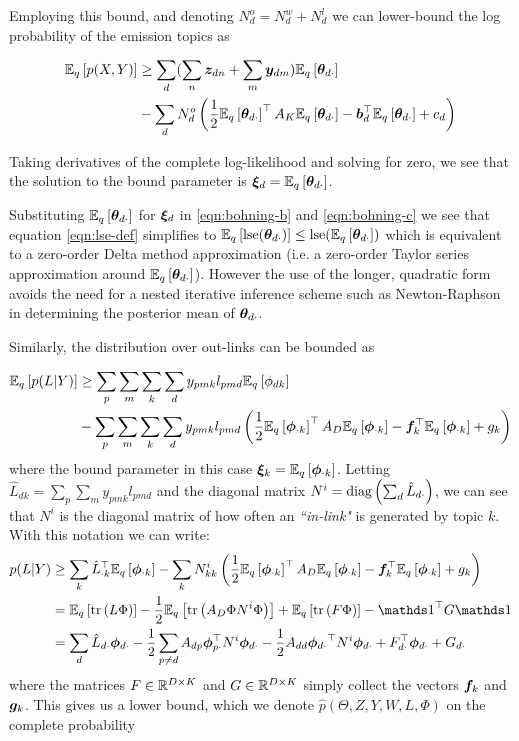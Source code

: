 Employing this bound, and denoting $N^o_d = N^w_d + N^l_d$ we can lower-bound the log probability of the emission topics as

\begin{equation}
\begin{aligned}
\ex{p(X,Y)}{q} & \geq \sum_d  (\sum_n \vv{z}_{dn} + \sum_m \vv{y}_{dm}) \ex{\thdo}{q} \\
   & - \sum_d N^o_d \left(\half \ex{\thdo}{q}\T A_K \ex{\thdo}{q} - \vv{b}_d\T\ex{\thdo}{q} + c_d\right)
\end{aligned}
\end{equation}

Taking derivatives of the complete log-likelihood and solving for zero, we see that the solution to the bound parameter is $\Ed = \ex{\thdo}{q}$. 

Substituting $\ex{\thdo}{q}$ for $\Ed$ in \eqref{eqn:bohning-b} and \eqref{eqn:bohning-c} we see that equation \eqref{eqn:lse-def} simplifies to $\ex{\lse(\thdo)}{q} \leq \lse(\ex{\thdo}{q})$ which is equivalent to a zero-order Delta method approximation (i.e. a zero-order Taylor series approximation around $\ex{\thdo}{q}$). However the use of the longer, quadratic form avoids the need for a nested iterative inference scheme such as Newton-Raphson in determining the posterior mean of $\thdo$.

Similarly, the distribution over out-links can be bounded as

\begin{align}
\ex{p(L|Y)}{q} & \geq \sum_p \sum_m \sum_k \sum_d y_{pmk} l_{pmd} \ex{\phi_{dk}}{q} \\
 & - \sum_p \sum_m \sum_k \sum_d y_{pmk} l_{pmd} \left(\half \ex{\phok}{q}\T A_D \ex{\phok}{q} - \vv{f}_k\T \ex{\phok}{q} + g_k\right)
\end{align}
where the bound parameter in this case $\vv{\xi}_k = \ex{\phok}{q}$. Letting $\hat{L}_{dk} = \sum_p \sum_m y_{pmk} l_{pmd}$ and the diagonal matrix $N^i = \diag{\sum_d \hat{L}_{d\cdot}}$, we can see that $N^i$ is the diagonal matrix of how often an \emph{``in-link"} is generated by topic $k$. With this notation we can write:
\begin{align}
p(L|Y) & \geq \sum_k \hat{L}_{\cdot k}\T \ex{\phok}{q} - \sum_k N^i_{kk} \left(\half \ex{\phok}{q}\T A_D \ex{\phok}{q} - \vv{f}_k\T \ex{\phok}{q} + g_k\right) \\
& = \ex{\Tr{L \Phi}}{q} - \half \ex{\Tr{A_D \Phi N^i \Phi}}{q} + \ex{\Tr{F \Phi}}{q} - \one\T G \one \\
& = \sum_d \hat{L}_{d\cdot} \phdo - \half \sum_{p \neq d} A_{dp} \vv{\phi}_{p\cdot}\T N^i \phdo -\half A_{dd} \phdo\T N^i \phdo + F_{d\cdot}\T\phdo + G_{d\cdot}
\end{align}
where the matrices $F \in \MReal{D}{K}$ and $G \in \MReal{D}{K}$ simply collect the vectors $\vv{f}_k$ and $\vv{g}_k$. This gives us a lower bound, which we denote $\hat{p}(\Theta, Z, Y, W, L, \Phi)$  on the complete probability


